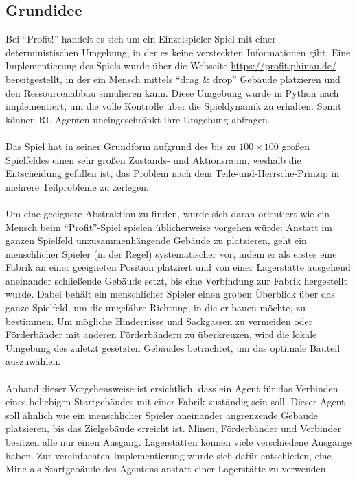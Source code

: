 \subsection{Grundidee}
Bei “Profit!” handelt es sich um ein Einzelspieler-Spiel mit einer deterministischen Umgebung, in der es keine versteckten Informationen gibt. Eine Implementierung des Spiels wurde über die Webseite \url{https://profit.phinau.de/} bereitgestellt, in der ein Mensch mittels “drag \& drop” Gebäude platzieren und den Ressourcenabbau simulieren kann. Diese Umgebung wurde in Python nach implementiert, um die volle Kontrolle über die Spieldynamik zu erhalten. Somit können RL-Agenten uneingeschränkt ihre Umgebung abfragen.
\\\\
Das Spiel hat in seiner Grundform aufgrund des bis zu $100\times100$ großen Spielfeldes einen sehr großen Zustands- und Aktionsraum, weshalb die Entscheidung gefallen ist, das Problem nach dem Teile-und-Herrsche-Prinzip in mehrere Teilprobleme zu zerlegen.
\\\\
Um eine geeignete Abstraktion zu finden, wurde sich daran orientiert wie ein Mensch beim “Profit”-Spiel spielen üblicherweise vorgehen würde: Anstatt im ganzen Spielfeld unzusammenhängende Gebäude zu platzieren, geht ein menschlicher Spieler (in der Regel) systematischer vor, indem er als erstes eine Fabrik an einer geeigneten Position platziert und von einer Lagerstätte ausgehend aneinander schließende Gebäude setzt, bis eine Verbindung zur Fabrik hergestellt wurde. Dabei behält ein menschlicher Spieler einen groben Überblick über das ganze Spielfeld, um die ungefähre Richtung, in die er bauen möchte, zu bestimmen. Um mögliche Hindernisse und Sackgassen zu vermeiden oder Förderbänder mit anderen Förderbändern zu überkreuzen, wird die lokale Umgebung des zuletzt gesetzten Gebäudes betrachtet, um das optimale Bauteil auszuwählen. 
\\\\
Anhand dieser Vorgehensweise ist ersichtlich, dass ein Agent für das Verbinden eines beliebigen Startgebäudes mit einer Fabrik zuständig sein soll. Dieser Agent soll ähnlich wie ein menschlicher Spieler aneinander angrenzende Gebäude platzieren, bis das Zielgebäude  erreicht ist. 
Minen, Förderbänder und Verbinder besitzen alle nur einen Ausgang. Lagerstätten können viele verschiedene Ausgänge haben. 
Zur vereinfachten Implementierung wurde sich dafür entschieden, eine Mine als Startgebäude des Agentens anstatt einer Lagerstätte zu verwenden. 
